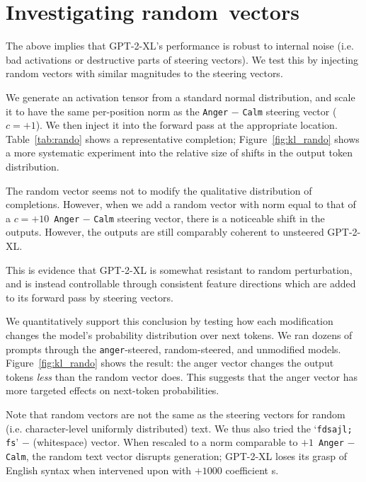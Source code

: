 \section{Investigating random \shortmethod\,vectors}
\label{app:rando}
\vspace{2mm}

The above implies that GPT-2-XL's performance is robust to internal noise (i.e. bad activations or destructive parts of steering vectors). We test this by injecting random vectors with similar magnitudes to the steering vectors. 

We generate an activation tensor from a standard normal distribution, and scale it to have the same per-position norm as the \texttt{Anger} $-$ \texttt{Calm} steering vector ($c= +1$). We then inject it into the forward pass at the appropriate location. Table~\ref{tab:rando} shows a representative completion; Figure~\ref{fig:kl_rando} shows a more systematic experiment into the relative size of shifts in the output token distribution.


The random vector seems not to modify the qualitative distribution of completions. However, when we add a random vector with norm equal to that of a $c = +10$\, \texttt{Anger} $-$ \texttt{Calm} steering vector, there is a noticeable shift in the outputs. 
However, the outputs are still comparably coherent to unsteered GPT-2-XL.

This is evidence that GPT-2-XL is somewhat resistant to random perturbation, and is instead controllable through consistent feature directions which are added to its forward pass by steering vectors. 

We quantitatively support this conclusion by testing how each modification changes the model's probability distribution over next tokens. We ran dozens of prompts through the \texttt{anger}-steered, random-steered, and unmodified models. Figure~\ref{fig:kl_rando} shows the result: the anger vector changes the output tokens \textit{less} than the random vector does. This suggests that the anger vector has more targeted effects on next-token probabilities.


Note that random vectors are not the same as the steering vectors for random (i.e. character-level uniformly distributed) text. We thus also tried the `\texttt{fdsajl; fs}' $-$ (whitespace) vector. When rescaled to a norm comparable to $+1$\, \texttt{Anger} $-$ \texttt{Calm}, the random text vector disrupts generation; GPT-2-XL loses its grasp of English syntax when intervened upon with $+1000$ coefficient \shortmethod s.


